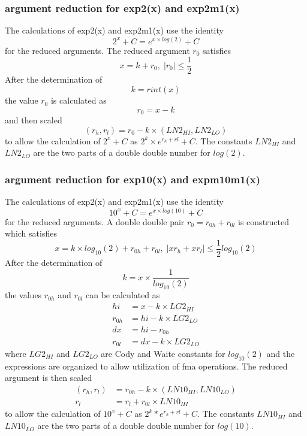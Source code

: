 \documentclass[10pt,a4paper,draft]{article}
\numberwithin{equation}{subsection}
\begin{document}
\subsubsection{argument reduction for exp2(x) and exp2m1(x)}

    The calculations of exp2(x) and exp2m1(x) use the
    identity
    \begin{equation}
        2^x + C = e^{x \times log(2)} + C
    \end{equation}
    for the reduced arguments.
    The reduced argument $ r_0 $ satisfies
    \begin{equation}
        x = k + r_0, \;
        |r_0| \le \frac{1}{2}
    \end{equation}
    After the determination of
    \[
        k = rint(x)
    \]
    the value $r_0$ is calculated as
    \[
       r_0 = x - k
    \]
    and then scaled
    \[
       (r_h, r_l) = r_0 - k \times (LN2_{HI}, LN2_{LO})
    \]
    to allow the calculation of $ 2^x + C $ as $ 2^k \times e^{r_h+ rl} + C$.
    The constants $LN2_{HI}$ and $LN2_{LO}$ are the two parts of a double double number for $log(2)$.

\subsubsection{argument reduction for exp10(x) and expm10m1(x)}

    The calculations of exp2(x) and exp2m1(x) use the
    identity
    \begin{equation}
        10^x + C = e^{x \times log(10)} + C
    \end{equation}
    for the reduced arguments. A  double double pair $ r_0= r_{0h} + r_{0l} $ is constructed which satisfies
    \begin{equation}
        x = k \times log_{10}(2) + r_{0h} + r_{0l}, \;
        |xr_h +xr_l| \le \frac{1}{2} log_{10}(2)
    \end{equation}
    After the determination of
    \[
        k = x \times \frac{1}{log_{10}(2)}
    \]
    the values $r_{0h}$ and $r_{0l}$ can be calculated as
    \[
       \begin{aligned}
       hi &= x - k \times LG2_{HI} \\
       r_{0h} &= hi - k \times LG2_{LO} \\
       dx & = hi - r_{0h} \\
       r_{0l} &= dx - k \times LG2_{LO}
       \end{aligned}
    \]
    where $LG2_{HI}$ and $LG2_{LO}$ are Cody and Waite constants for
    $log_{10}(2)$
    and the expressions are organized to allow utilization of fma operations.
    The reduced argument is then scaled
    \[
        \begin{aligned}
        (r_h, r_l) &= r_{0h} - k \times (LN10_{HI}, LN10_{LO}) \\
        r_l &= r_l + r_{0l} \times LN10_{HI}
        \end{aligned}
    \]
    to allow the calculation of $ 10^x + C $ as $ 2^k * e^{r_h+ rl} + C$.
    The constants $LN10_{HI}$ and $LN10_{LO}$ are the two parts of a double double number for $log(10)$.
\end{document}
